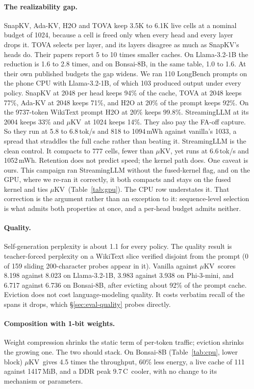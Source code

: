 \documentclass[sigconf, anonymous=false, screen=true]{acmart}
\newcommand{\muKV}{$\mu$KV}
\newcommand{\C}{\,\textdegree C}
\begin{document}
\paragraph{The realizability gap.} SnapKV, Ada-KV, H2O and TOVA keep 3.5K to 6.1K live cells at a nominal budget of 1024, because a cell is freed only when every head and every layer drops it. TOVA selects per layer, and its layers disagree as much as SnapKV's heads do. Their papers report 5 to 10 times smaller caches. On Llama-3.2-1B the reduction is 1.6 to 2.8 times, and on Bonsai-8B, in the same table, 1.0 to 1.6. At their own published budgets the gap widens. We ran 110 LongBench prompts on the phone CPU with Llama-3.2-1B, of which 103 produced output under every policy. SnapKV at 2048 per head keeps 94\% of the cache, TOVA at 2048 keeps 77\%, Ada-KV at 2048 keeps 71\%, and H2O at 20\% of the prompt keeps 92\%. On the 9737-token WikiText prompt H2O at 20\% keeps 99.8\%. StreamingLLM at its 2004 keeps 33\% and \muKV\ at 1024 keeps 14\%. They also pay the FA-off capture. So they run at 5.8 to 6.8\,tok/s and 818 to 1094\,mWh against vanilla's 1033, a spread that straddles the full cache rather than beating it. StreamingLLM is the clean control. It compacts to 777 cells, fewer than \muKV, yet runs at 6.6\,tok/s and 1052\,mWh. Retention does not predict speed; the kernel path does. One caveat is ours. This campaign ran StreamingLLM without the fused-kernel flag, and on the GPU, where we re-ran it correctly, it both compacts and stays on the fused kernel and ties \muKV\ (Table~\ref{tab:gpu}). The CPU row understates it. That correction is the argument rather than an exception to it: sequence-level selection is what admits both properties at once, and a per-head budget admits neither.

\paragraph{Quality.} Self-generation perplexity is about 1.1 for every policy. The quality result is teacher-forced perplexity on a WikiText slice verified disjoint from the prompt (0 of 159 sliding 200-character probes appear in it). Vanilla against \muKV\ scores 8.198 against 8.023 on Llama-3.2-1B, 3.983 against 3.938 on Phi-3-mini, and 6.717 against 6.736 on Bonsai-8B, after evicting about 92\% of the prompt cache. Eviction does not cost language-modeling quality. It costs verbatim recall of the spans it drops, which \S\ref{sec:eval-quality} probes directly.

\paragraph{Composition with 1-bit weights.} Weight compression shrinks the static term of per-token traffic; eviction shrinks the growing one. The two should stack. On Bonsai-8B (Table~\ref{tab:cpu}, lower block) \muKV\ gives 4.5 times the throughput, 60\% less energy, a live cache of 111 against 1417\,MiB, and a DDR peak 9.7\C\ cooler, with no change to its mechanism or parameters.
\end{document}
